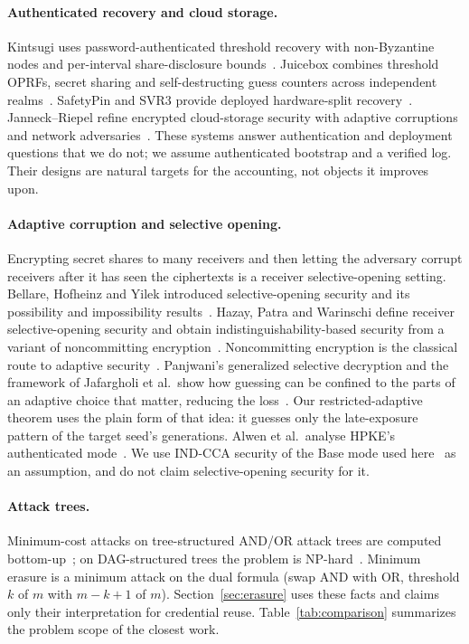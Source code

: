 \documentclass[pdflatex,sn-mathphys-num]{sn-jnl}%
\theoremstyle{plain}
\theoremstyle{definition}
\begin{document}
\paragraph{Authenticated recovery and cloud storage.}
Kintsugi uses password-authenticated threshold recovery with non-Byzantine nodes and per-interval share-disclosure bounds~\cite{ma2025}. Juicebox combines threshold OPRFs, secret sharing and self-destructing guess counters across independent realms~\cite{trapp2025}. SafetyPin and SVR3 provide deployed hardware-split recovery~\cite{dauterman2020,connell2024}. Janneck--Riepel refine encrypted cloud-storage security with adaptive corruptions and network adversaries~\cite{janneck2026}. These systems answer authentication and deployment questions that we do not; we assume authenticated bootstrap and a verified log. Their designs are natural targets for the accounting, not objects it improves upon.

\paragraph{Adaptive corruption and selective opening.}
Encrypting secret shares to many receivers and then letting the adversary corrupt receivers after it has seen the ciphertexts is a receiver selective-opening setting. Bellare, Hofheinz and Yilek introduced selective-opening security and its possibility and impossibility results~\cite{bellare2009}. Hazay, Patra and Warinschi define receiver selective-opening security and obtain indistinguishability-based security from a variant of noncommitting encryption~\cite{hazay2015}. Noncommitting encryption is the classical route to adaptive security~\cite{canetti1996}. Panjwani's generalized selective decryption and the framework of Jafargholi et al.\ show how guessing can be confined to the parts of an adaptive choice that matter, reducing the loss~\cite{panjwani2007,jafargholi2017}. Our restricted-adaptive theorem uses the plain form of that idea: it guesses only the late-exposure pattern of the target seed's generations. Alwen et al.\ analyse HPKE's authenticated mode~\cite{alwen2021}. We use IND-CCA security of the Base mode used here~\cite{rfc9180} as an assumption, and do not claim selective-opening security for it.

\paragraph{Attack trees.}
Minimum-cost attacks on tree-structured AND/OR attack trees are computed bottom-up~\cite{mauw2005}; on DAG-structured trees the problem is NP-hard~\cite{lopuhaa2022}. Minimum erasure is a minimum attack on the dual formula (swap AND with OR, threshold $k$ of $m$ with $m-k+1$ of $m$). Section~\ref{sec:erasure} uses these facts and claims only their interpretation for credential reuse. Table~\ref{tab:comparison} summarizes the problem scope of the closest work.
\end{document}
